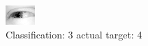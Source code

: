 \begin{figure}[h!]
\begin{center}
\includegraphics[width=0.60\columnwidth]{figures/ID2552_class_3_target_4.png}
\end{center}
\caption{ Classification: 3 actual target: 4}
\label{fig:ID2552_class_3_target_4}
\end{figure}

